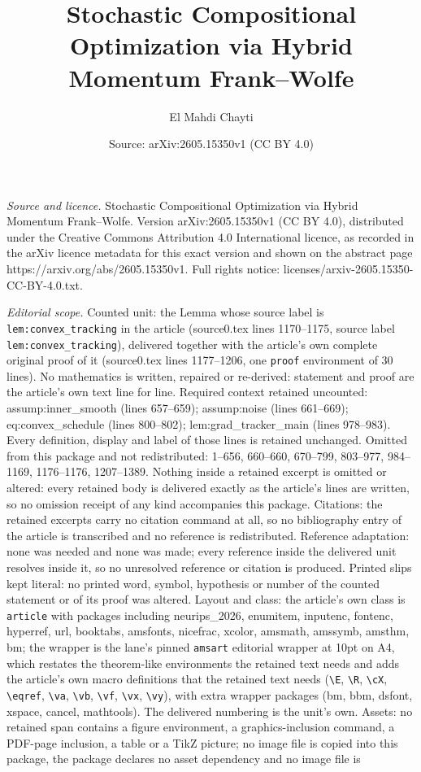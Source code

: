 \documentclass[10pt,a4paper]{amsart}
\title[Stochastic Compositional Optimization via Hybrid Momentum Fr]{Stochastic Compositional Optimization via Hybrid Momentum Frank--Wolfe}
\author{El Mahdi Chayti}
\date{Source: arXiv:2605.15350v1 (CC BY 4.0)}
\begin{document}
\maketitle

\noindent\emph{Source and licence.} Stochastic Compositional Optimization via Hybrid Momentum Frank--Wolfe. Version arXiv:2605.15350v1 (CC BY 4.0), distributed under the Creative Commons Attribution 4.0 International licence, as recorded in the arXiv licence metadata for this exact version and shown on the abstract page https://arxiv.org/abs/2605.15350v1. Full rights notice: licenses/arxiv-2605.15350-CC-BY-4.0.txt.\par\smallskip

\noindent\textit{Editorial scope.} Counted unit: the Lemma whose source label is \texttt{lem:convex\_tracking} in the article (source0.tex lines 1170--1175, source label \texttt{lem:convex\_tracking}), delivered together with the article's own complete original proof of it (source0.tex lines 1177--1206, one \texttt{proof} environment of 30 lines). No mathematics is written, repaired or re-derived: statement and proof are the article's own text line for line. Required context retained uncounted: assump:inner\_smooth (lines 657--659); assump:noise (lines 661--669); eq:convex\_schedule (lines 800--802); lem:grad\_tracker\_main (lines 978--983). Every definition, display and label of those lines is retained unchanged. Omitted from this package and not redistributed: 1--656, 660--660, 670--799, 803--977, 984--1169, 1176--1176, 1207--1389. Nothing inside a retained excerpt is omitted or altered: every retained body is delivered exactly as the article's lines are written, so no omission receipt of any kind accompanies this package. Citations: the retained excerpts carry no citation command at all, so no bibliography entry of the article is transcribed and no reference is redistributed. Reference adaptation: none was needed and none was made; every reference inside the delivered unit resolves inside it, so no unresolved reference or citation is produced. Printed slips kept literal: no printed word, symbol, hypothesis or number of the counted statement or of its proof was altered. Layout and class: the article's own class is \texttt{article} with packages including neurips\_2026, enumitem, inputenc, fontenc, hyperref, url, booktabs, amsfonts, nicefrac, xcolor, amsmath, amssymb, amsthm, bm; the wrapper is the lane's pinned \texttt{amsart} editorial wrapper at 10pt on A4, which restates the theorem-like environments the retained text needs and adds the article's own macro definitions that the retained text needs (\texttt{\textbackslash E}, \texttt{\textbackslash R}, \texttt{\textbackslash cX}, \texttt{\textbackslash eqref}, \texttt{\textbackslash va}, \texttt{\textbackslash vb}, \texttt{\textbackslash vf}, \texttt{\textbackslash vx}, \texttt{\textbackslash vy}), with extra wrapper packages (bm, bbm, dsfont, xspace, cancel, mathtools). The delivered numbering is the unit's own. Assets: no retained span contains a figure environment, a graphics-inclusion command, a PDF-page inclusion, a table or a TikZ picture; no image file is copied into this package, the package declares no asset dependency and no image file is 
\end{document}
